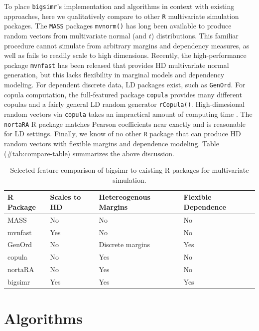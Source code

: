 \documentclass[
]{jss}
\begin{document}
To place \texttt{bigsimr}'s implementation and algorithms in context
with existing approaches, here we qualitatively compare to other
\texttt{R} multivariate simulation packages. The \texttt{MASS} packages
\texttt{mvnorm()} has long been available to produce random vectors from
multivariate normal (and \(t\)) distributions. This familiar procedure
cannot simulate from arbitrary margins and dependency measures, as well
as fails to readily scale to high dimensions. Recently, the
high-performance package \texttt{mvnfast} \citep{Fasiolo2016} has been
released that provides HD multivariate normal generation, but this lacks
flexibility in marginal models and dependency modeling. For dependent
discrete data, LD packages exist, such as \texttt{GenOrd}. For copula
computation, the full-featured package \texttt{copula} provides many
different copulas and a fairly general LD random generator
\texttt{rCopula()}. High-dimesional random vectors via \texttt{copula}
takes an impractical amount of computing time \citep{Li2019gpu}. The
\texttt{nortaRA} R package matches Pearson coefficients near exactly and
is reasonable for LD settings. Finally, we know of no other \texttt{R}
package that can produce HD random vectors with flexible margins and
dependence modeling. Table (\#tab:compare-table) summarizes the above
discussion.

\begin{table}[]
\centering
\caption{Selected feature comparison of bigsimr to existing R packages for multivariate simulation.}
\label{tab:compare-table}
\begin{tabular}{@{}llll@{}}
R Package & Scales to HD & Hetereogenous Margins & Flexible Dependence \\ \midrule
MASS      & No           & No                    & No                  \\
mvnfast   & Yes          & No                    & No                  \\
GenOrd    & No           & Discrete margins      & Yes                 \\
copula    & No           & Yes                   & No                  \\
nortaRA   & No           & Yes                   & No                  \\
bigsimr   & Yes          & Yes                   & Yes                
\end{tabular}
\end{table}

\hypertarget{algorithms}{%
\section{Algorithms}\label{algorithms}}
\end{document}
